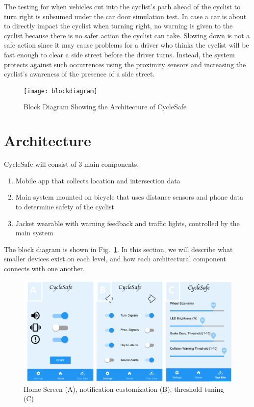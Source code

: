 \documentclass[journal]{IEEEtran}
\begin{document}
The testing for when vehicles cut into the cyclist's path ahead of the cyclist to turn right is subsumed under the car door simulation test. In case a car is about to directly impact the cyclist when turning right, no warning is given to the cyclist because there is no safer action the cyclist can take. Slowing down is not a safe action since it may cause problems for a driver who thinks the cyclist will be fast enough to clear a side street before the driver turns. Instead, the system protects against such occurrences using the proximity sensors and increasing the cyclist's awareness of the presence of a side street.


\begin{figure}
    \centering
    \texttt{[image: blockdiagram]}
    \caption{Block Diagram Showing the Architecture of CycleSafe}
    \label{fig:block_diagram}
\end{figure}
\section{Architecture}
CycleSafe will consist of 3 main components,
\begin{enumerate}
    \item Mobile app that collects location and intersection data
    \item Main system mounted on bicycle that uses distance sensors and phone data to determine safety of the cyclist
    \item Jacket wearable with warning feedback and traffic lights, controlled by the main system
\end{enumerate}
The block diagram is shown in Fig.~\ref{fig:block_diagram}. In this section, we will describe what smaller devices exist on each level, and how each architectural component connects with one another.

\begin{figure}
    \centering
    \includegraphics[width=\columnwidth]{images/app_screen.png}
    \caption{Home Screen (A), notification customization (B), threshold tuning (C)}
    \label{fig:app_screen}
\end{figure}
\end{document}
